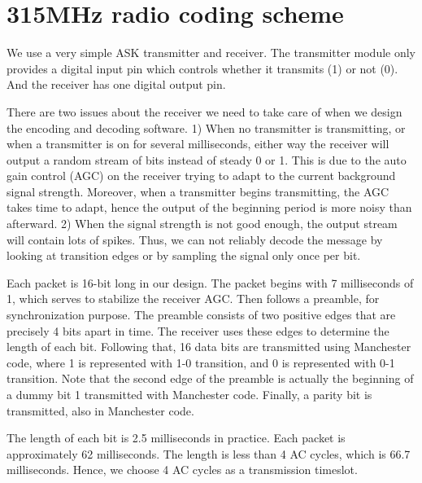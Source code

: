 \appendix \chapter{315MHz radio coding scheme}\label{app1}

We use a very simple ASK transmitter and receiver. The transmitter module only provides a digital input pin which controls whether it transmits (1) or not (0). And the receiver has one digital output pin.
 
There are two issues about the receiver we need to take care of when we design the encoding and decoding software. 1) When no transmitter is transmitting, or when a transmitter is on for several milliseconds, either way the receiver will output a random stream of bits instead of steady 0 or 1. This is due to the auto gain control (AGC) on the receiver trying to adapt to the current background signal strength. Moreover, when a transmitter begins transmitting, the AGC takes time to adapt, hence the output of the beginning period is more noisy than afterward. 2) When the signal strength is not good enough, the output stream will contain lots of spikes. Thus, we can not reliably decode the message by looking at transition edges or by sampling the signal only once per bit. 

Each packet is 16-bit long in our design. The packet begins with 7 milliseconds of 1, which serves to stabilize the receiver AGC. Then follows a preamble, for synchronization purpose. The preamble consists of two positive edges that are precisely 4 bits apart in time. The receiver uses these edges to determine the length of each bit. Following that, 16 data bits are transmitted using Manchester code, where 1 is represented with 1-0 transition, and 0 is represented with 0-1 transition. Note that the second edge of the preamble is actually the beginning of a dummy bit 1 transmitted with Manchester code. Finally, a parity bit is transmitted, also in Manchester code. 

The length of each bit is 2.5 milliseconds in practice. Each packet is approximately 62 milliseconds. The length is less than 4 AC cycles, which is 66.7 milliseconds. Hence, we choose 4 AC cycles as a transmission timeslot. 

